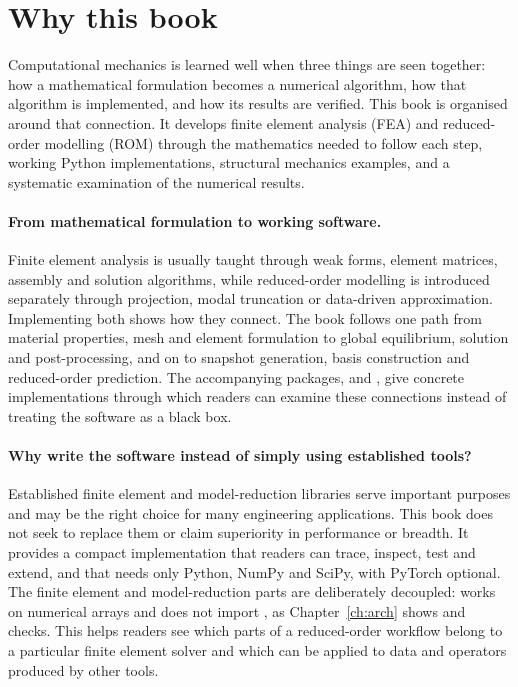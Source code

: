 \section*{Why this book}

Computational mechanics is learned well when three things are seen together: how a mathematical formulation becomes a numerical algorithm, how that algorithm is implemented, and how its results are verified. This book is organised around that connection. It develops finite element analysis (FEA) and reduced-order modelling (ROM) through the mathematics needed to follow each step, working Python implementations, structural mechanics examples, and a systematic examination of the numerical results.

\paragraph{From mathematical formulation to working software.} Finite element analysis is usually taught through weak forms, element matrices, assembly and solution algorithms, while reduced-order modelling is introduced separately through projection, modal truncation or data-driven approximation. Implementing both shows how they connect. The book follows one path from material properties, mesh and element formulation to global equilibrium, solution and post-processing, and on to snapshot generation, basis construction and reduced-order prediction. The accompanying packages, \fea{} and \rom{}, give concrete implementations through which readers can examine these connections instead of treating the software as a black box.

\paragraph{Why write the software instead of simply using established tools?} Established finite element and model-reduction libraries serve important purposes and may be the right choice for many engineering applications. This book does not seek to replace them or claim superiority in performance or breadth. It provides a compact implementation that readers can trace, inspect, test and extend, and that needs only Python, NumPy and SciPy, with PyTorch optional. The finite element and model-reduction parts are deliberately decoupled: \rom{} works on numerical arrays and does not import \fea{}, as Chapter~\ref{ch:arch} shows and checks. This helps readers see which parts of a reduced-order workflow belong to a particular finite element solver and which can be applied to data and operators produced by other tools.

